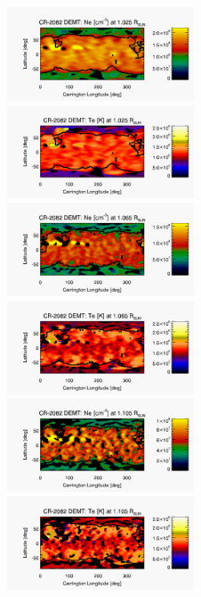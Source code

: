 \documentclass[namedreferences]{solarphysics}
\begin{document}
\begin{article}
\begin{figure}%
\begin{center}
\includegraphics[width=0.495\textwidth]{figs/map_Ne_CR2082_DEMT-EUVI_behind_H1-L3523_r3d_1025_Rsun.pdf}
\includegraphics[width=0.495\textwidth]{figs/map_Tm_CR2082_DEMT-EUVI_behind_H1-L3523_r3d_1025_Rsun.pdf}
\includegraphics[width=0.495\textwidth]{figs/map_Ne_CR2082_DEMT-EUVI_behind_H1-L3523_r3d_1065_Rsun.pdf}
\includegraphics[width=0.495\textwidth]{figs/map_Tm_CR2082_DEMT-EUVI_behind_H1-L3523_r3d_1065_Rsun.pdf}
\includegraphics[width=0.495\textwidth]{figs/map_Ne_CR2082_DEMT-EUVI_behind_H1-L3523_r3d_1105_Rsun.pdf}
\includegraphics[width=0.495\textwidth]{figs/map_Tm_CR2082_DEMT-EUVI_behind_H1-L3523_r3d_1105_Rsun.pdf}

\end{center}
\end{figure}
\end{article}
\end{document}
